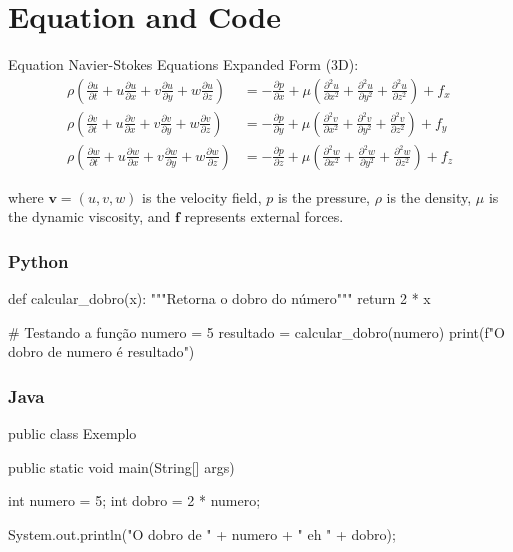 
\section{Equation and Code}

\begin{frame}{Equation}
    Navier-Stokes Equations Expanded Form (3D):
    \footnotesize
        \begin{align*}
            \rho\left(\frac{\partial u}{\partial t} + u\frac{\partial u}{\partial x} + v\frac{\partial u}{\partial y} + w\frac{\partial u}{\partial z}\right) &= -\frac{\partial p}{\partial x} + \mu\left(\frac{\partial^2 u}{\partial x^2} + \frac{\partial^2 u}{\partial y^2} + \frac{\partial^2 u}{\partial z^2}\right) + f_x \\[0.3cm]
            \rho\left(\frac{\partial v}{\partial t} + u\frac{\partial v}{\partial x} + v\frac{\partial v}{\partial y} + w\frac{\partial v}{\partial z}\right) &= -\frac{\partial p}{\partial y} + \mu\left(\frac{\partial^2 v}{\partial x^2} + \frac{\partial^2 v}{\partial y^2} + \frac{\partial^2 v}{\partial z^2}\right) + f_y \\[0.3cm]
            \rho\left(\frac{\partial w}{\partial t} + u\frac{\partial w}{\partial x} + v\frac{\partial w}{\partial y} + w\frac{\partial w}{\partial z}\right) &= -\frac{\partial p}{\partial z} + \mu\left(\frac{\partial^2 w}{\partial x^2} + \frac{\partial^2 w}{\partial y^2} + \frac{\partial^2 w}{\partial z^2}\right) + f_z
        \end{align*}
        
    where $\mathbf{v} = (u,v,w)$ is the velocity field, $p$ is the pressure, $\rho$ is the density, $\mu$ is the dynamic viscosity, and $\mathbf{f}$ represents external forces.
\end{frame}


\begin{frame}[fragile]
    \frametitle{Python}
    
    \begin{python}
def calcular_dobro(x):
    """Retorna o dobro do número"""
    return 2 * x

# Testando a função
numero = 5
resultado = calcular_dobro(numero)
print(f"O dobro de {numero} é {resultado}")
    \end{python}
\end{frame}

\begin{frame}[fragile]
    \frametitle{Java}
    
    \begin{java}
public class Exemplo {
    public static void main(String[] args) {
        int numero = 5;
        int dobro = 2 * numero;
        
        System.out.println("O dobro de " + numero +
                         " eh " + dobro);
    }
}
    \end{java}
\end{frame}
